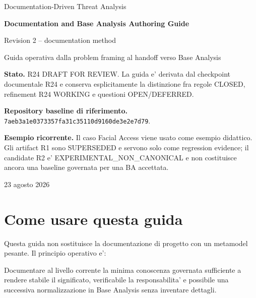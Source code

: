 \documentclass[11pt,a4paper]{article}
\newcommand{\code}[1]{\texttt{#1}}
\begin{document}
\begin{titlepage}
\centering
\vspace*{1.5cm}
{\Large Documentation-Driven Threat Analysis\par}
\vspace{0.8cm}
{\Huge\bfseries Documentation and Base Analysis Authoring Guide\par}
\vspace{0.25cm}
{\LARGE Revision 2 -- documentation method\par}
\vspace{0.9cm}
{\large Guida operativa dalla problem framing al handoff verso Base Analysis\par}
\vfill
\begin{minipage}{0.86\textwidth}
\small
\textbf{Stato.} R24 DRAFT FOR REVIEW. La guida e' derivata dal checkpoint documentale R24 e conserva esplicitamente la distinzione fra regole CLOSED, refinement R24 WORKING e questioni OPEN/DEFERRED.

\medskip
\textbf{Repository baseline di riferimento.} \code{7aeb3a1e0373357fa31c35110d9160de3e2e7d79}.

\medskip
\textbf{Esempio ricorrente.} Il caso Facial Access viene usato come esempio didattico. Gli artifact R1 sono SUPERSEDED e servono solo come regression evidence; il candidate R2 e' EXPERIMENTAL\_NON\_CANONICAL e non costituisce ancora una baseline governata per una BA accettata.
\end{minipage}
\vfill
{\large 23 agosto 2026\par}
\end{titlepage}

\tableofcontents
\newpage
{}

\section{Come usare questa guida}

Questa guida non sostituisce la documentazione di progetto con un metamodel pesante. Il principio operativo e':

\begin{statusclosed}
Documentare al livello corrente la minima conoscenza governata sufficiente a rendere stabile il significato, verificabile la responsabilita' e possibile una successiva normalizzazione in Base Analysis senza inventare dettagli.
\end{statusclosed}
\end{document}
